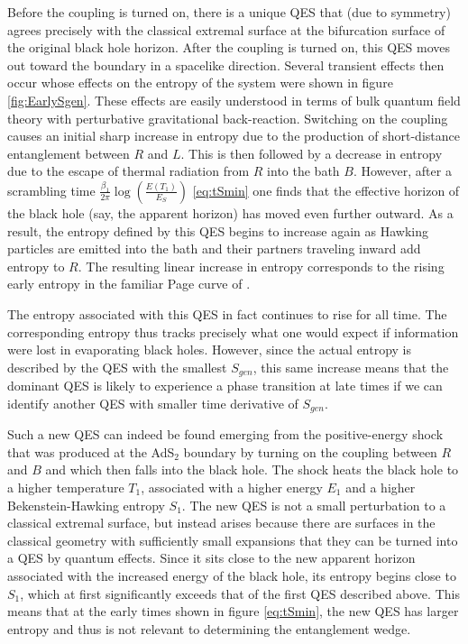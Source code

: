 \documentclass[12pt]{article}
\begin{document}
Before the coupling is turned on, there is a unique QES that (due to symmetry) agrees precisely with the classical extremal surface at the bifurcation surface of the original black hole horizon.  After the coupling is turned on, this QES moves out toward the boundary in a spacelike direction.  Several transient effects then occur whose effects on the entropy of the system were shown in figure \ref{fig:EarlySgen}.  These effects are easily understood in terms of bulk quantum field theory with perturbative gravitational back-reaction.  Switching on the coupling causes an initial sharp increase in entropy due to the production of short-distance entanglement between $R$ and $L$.  This is then followed by a decrease in entropy due to the escape of thermal radiation from $R$ into the bath $B$.  However, after a scrambling time $\frac{\beta_1}{2\pi}\log \left(\frac{E(T_1)}{E_S} \right)$ \eqref{eq:tSmin} one finds that the effective horizon of the black hole (say, the apparent horizon) has moved even further outward.  As a result, the entropy defined by this QES begins to increase again as Hawking particles are emitted into the bath and their partners traveling inward add entropy to $R$.  The resulting linear increase in entropy corresponds to the rising early entropy in the familiar Page curve of \cite{Page:1993df}.

The entropy associated with this QES in fact continues to rise for all time. The corresponding entropy thus tracks precisely what one would expect if information were lost in evaporating black holes.  However, since the actual entropy is described by the QES with the smallest $S_{gen}$, this same increase means that the dominant QES is likely to experience a phase transition at late times if we can identify another QES with smaller time derivative of $S_{gen}$.

Such a new QES can indeed be found emerging from the positive-energy shock that was produced at the AdS$_2$ boundary by turning on the coupling between $R$ and $B$ and which then falls into the black hole.  The shock heats the black hole to a higher temperature $T_1$, associated with a higher energy $E_1$ and a higher Bekenstein-Hawking entropy $S_1$.  The new QES is not a small perturbation to a classical extremal surface, but instead arises because there are surfaces in the classical geometry with sufficiently small expansions that they can be turned into a QES by quantum effects.  Since it sits close to the new apparent horizon associated with the increased energy of the black hole, its entropy begins close to $S_1$, which at first significantly exceeds that of the first QES described above.  This means that at the early times shown in figure \eqref{eq:tSmin}, the new QES has larger entropy and thus is not relevant to determining the entanglement wedge.
\end{document}
